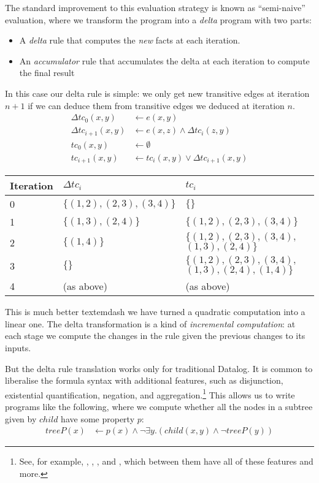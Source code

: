 The standard improvement to this evaluation strategy is known as ``semi-naive'' 
evaluation\autocite[See][section 13.1]{abiteboul1995foundations}, where we transform 
the program into a \emph{delta} program with two parts:
\begin{itemize}
  \item A \emph{delta} rule that computes the \emph{new} facts at each
    iteration. 
  \item An \emph{accumulator} rule that accumulates the delta at each
    iteration to compute the final result
\end{itemize}
In this case our delta rule is simple: we only get new transitive edges at iteration $n+1$ if we
can deduce them from transitive edges we deduced at iteration $n$.
\begin{align*}
  \Delta tc_{0}(x, y) &\leftarrow e(x, y)\\
  \Delta tc_{i+1}(x, y) &\leftarrow e(x, z) \wedge \Delta tc_i(z, y)\\
  tc_{0}(x, y) &\leftarrow \emptyset\\
  tc_{i+1}(x, y) &\leftarrow tc_{i}(x,y) \vee \Delta tc_{i+1}(x,y)
\end{align*}

\begin{center}
  \begin{tabular} {p{3.5em} p{8em} p{10em}}
    Iteration & $\Delta tc_i$ & $tc_i$ \\
    \toprule
    0 & $\{ (1, 2), (2, 3), (3, 4) \}$ & $\{ \}$\\
    1 & $\{ (1, 3), (2, 4) \}$ & $\{ (1, 2), (2, 3), (3, 4) \}$\\
    2 & $\{ (1, 4) \}$ & $\{ (1, 2), (2, 3), (3, 4),$ $(1, 3), (2, 4) \}$\\
    3 & $\{ \}$ & $\{ (1, 2), (2, 3), (3, 4),$ $(1, 3), (2, 4), (1, 4) \}$\\
    4 & (as above) & (as above) \\
    \bottomrule
  \end{tabular}
\end{center}
\medskip

This is much better textemdash{} we have turned a quadratic computation into a
linear one. The delta transformation is a kind of \emph{incremental
  computation}: at each stage we compute the changes in the rule given the previous
changes to its inputs.

But the delta rule translation works only for traditional Datalog. It is common to
liberalise the formula syntax with additional features, such as disjunction,
existential quantification, negation, and aggregation.\footnote{See, for
  example, \autocites(LogiQL)(){logicbloxWebsite}{halpin2014logiql},
  \autocites(Datomic)(){datomicWebsite},
  \autocites(Souffle)(){souffleWebsite}{scholz2016fast}, and
  \autocites(DES)(){saenz2011deductive}, which between them have all of these
  features and more. } 
This allows us to write programs like the following, where we compute whether all the
nodes in a subtree given by $child$ have some property $p$:
\begin{align*}
  treeP(x) &\leftarrow p(x) \wedge \neg \exists y . (child(x,y) \wedge \neg treeP(y))
\end{align*}

